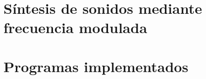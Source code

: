 







\tableofcontents
\newpage


%	
%		
%	
%	
\section{Síntesis de sonidos mediante frecuencia modulada}
	\label{Ejercicio-3}
	

\section{Programas implementados}
	\label{Ejercicio-8}
	


